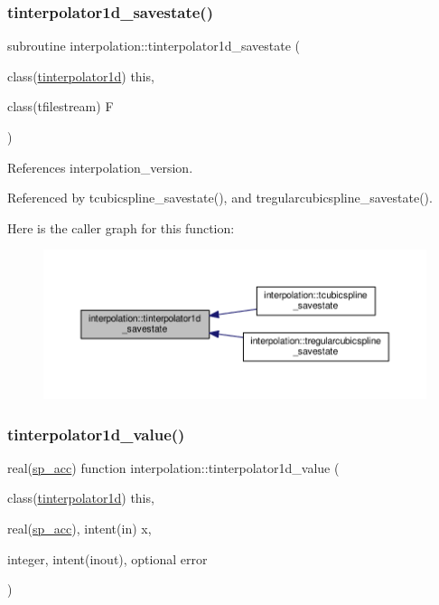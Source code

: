\subsubsection{\texorpdfstring{tinterpolator1d\+\_\+savestate()}{tinterpolator1d\_savestate()}}
{\footnotesize\ttfamily subroutine interpolation\+::tinterpolator1d\+\_\+savestate (\begin{DoxyParamCaption}\item[{class(\mbox{\hyperlink{structinterpolation_1_1tinterpolator1d}{tinterpolator1d}})}]{this,  }\item[{class(tfilestream)}]{F }\end{DoxyParamCaption})}



References interpolation\+\_\+version.



Referenced by tcubicspline\+\_\+savestate(), and tregularcubicspline\+\_\+savestate().

Here is the caller graph for this function\+:
\nopagebreak
\begin{figure}[H]
\begin{center}
\leavevmode
\includegraphics[width=350pt]{namespaceinterpolation_a2e4b0cd2e1a31f06c7202669b574df13_icgraph}
\end{center}
\end{figure}
\mbox{\label{namespaceinterpolation_a4bc299324720bbb5a8bce547f3f10c2e}} 
\subsubsection{\texorpdfstring{tinterpolator1d\+\_\+value()}{tinterpolator1d\_value()}}
{\footnotesize\ttfamily real(\mbox{\hyperlink{namespaceinterpolation_af72aa9a05feb8ef90b2d26e4a013abf3}{sp\+\_\+acc}}) function interpolation\+::tinterpolator1d\+\_\+value (\begin{DoxyParamCaption}\item[{class(\mbox{\hyperlink{structinterpolation_1_1tinterpolator1d}{tinterpolator1d}})}]{this,  }\item[{real(\mbox{\hyperlink{namespaceinterpolation_af72aa9a05feb8ef90b2d26e4a013abf3}{sp\+\_\+acc}}), intent(in)}]{x,  }\item[{integer, intent(inout), optional}]{error }\end{DoxyParamCaption})}

